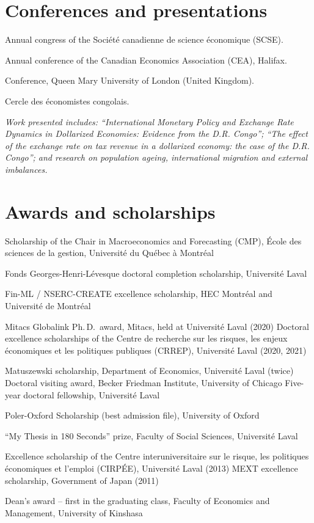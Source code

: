 \documentclass[11pt,letterpaper]{article}
\newenvironment{datelist}
  {\begin{description}[style=multiline,leftmargin=2.75cm,labelwidth=2.55cm,
     labelsep=0.2cm,font=\normalfont\small\color{soft},
     itemsep=0.45em,topsep=0.25em,parsep=0.15em]}
  {\end{description}}
\newcommand{\dotsep}{\;\textcolor{soft}{\textbullet}\;}
\newcommand{\meta}[1]{{\small\itshape\color{soft}#1}}
\begin{document}
\section{Conferences and presentations}
\begin{tight}
  \item Annual congress of the Société canadienne de science économique (SCSE).
  \item Annual conference of the Canadian Economics Association (CEA), Halifax.
  \item Conference, Queen Mary University of London (United Kingdom).
  \item Cercle des économistes congolais.
\end{tight}
\meta{Work presented includes: ``International Monetary Policy and Exchange Rate Dynamics in Dollarized Economies: Evidence from the D.R. Congo''; ``The effect of the exchange rate on tax revenue in a dollarized economy: the case of the D.R. Congo''; and research on population ageing, international migration and external imbalances.}
\section{Awards and scholarships}
\begin{datelist}
  \item[2025] Scholarship of the Chair in Macroeconomics and Forecasting (CMP), École des sciences de la gestion, Université du Québec à Montréal
  \item[2023] Fonds Georges-Henri-Lévesque doctoral completion scholarship, Université Laval
  \item[2022] Fin-ML / NSERC-CREATE excellence scholarship, HEC Montréal and Université de Montréal
  \item[2020--2021] Mitacs Globalink Ph.\,D.\ award, Mitacs, held at Université Laval (2020) \dotsep Doctoral excellence scholarships of the Centre de recherche sur les risques, les enjeux économiques et les politiques publiques (CRREP), Université Laval (2020, 2021)
  \item[2019] Matuszewski scholarship, Department of Economics, Université Laval (twice) \dotsep Doctoral visiting award, Becker Friedman Institute, University of Chicago \dotsep Five-year doctoral fellowship, Université Laval
  \item[2016] Poler-Oxford Scholarship (best admission file), University of Oxford
  \item[2014] ``My Thesis in 180 Seconds'' prize, Faculty of Social Sciences, Université Laval
  \item[2011--2013] Excellence scholarship of the Centre interuniversitaire sur le risque, les politiques économiques et l'emploi (CIRPÉE), Université Laval (2013) \dotsep MEXT excellence scholarship, Government of Japan (2011)
  \item[2010] Dean's award -- first in the graduating class, Faculty of Economics and Management, University of Kinshasa
\end{datelist}
\end{document}
